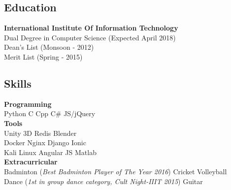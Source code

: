 \documentclass[letterpaper]{deedy-resume} %
\begin{document}

\lastupdated %



\begin{minipage}[t]{0.31\textwidth} %

\vspace{\topsep} %
\vspace{\topsep} %
\subsection{Education} 
\textbf{International Institute Of Information Technology}\\
\textbullet{}Dual Degree in Computer Science (Expected April 2018)\\
\textbullet{}Dean's List (Monsoon - 2012) \\
\textbullet{}Merit List (Spring - 2015) \\

\sectionspace %

\subsection{Skills}

\textbf{Programming} \\
Python \textbullet{} C \textbullet{} Cpp \textbullet{} C\# \textbullet{} JS/jQuery\\
\textbf{Tools} \\
Unity 3D \textbullet{} Redis \textbullet{} Blender\\
Docker \textbullet{} Nginx \textbullet{} Django \textbullet{} Ionic\\
Kali Linux \textbullet{} Angular JS \textbullet{} Matlab \\
\textbf{Extracurricular} \\
\textbullet{} Badminton (\textit{Best Badminton Player of The Year 2016}) \textbullet{}
Cricket \textbullet{} Volleyball\\
\textbullet{} Dance (\textit{1st in group dance category, Cult Night-IIIT 2015}) \textbullet{} Guitar\\
\sectionspace %


\end{minipage}
\end{document}
